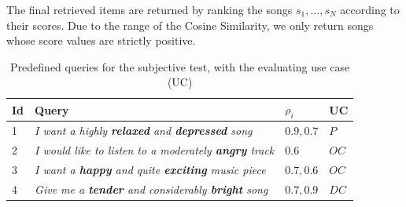 The final retrieved items are returned by ranking the songs $s_1,...,s_N$ according to their scores. Due to the range of the Cosine Similarity, we only return songs whose score values are strictly positive.
\begin{table}[tbp]

\caption{Predefined queries for the subjective test, with the evaluating use case (UC)}
\label{tab:DCSM:queries}
\centering
\bgroup
\def\arraystretch{1.5}
\begin{tabular}{||l|p{}|p{}|p{}||}
\hline
\hline
Id & Query & $\rho_i$ & UC \\
\hline
\hline
1 & \textit{I want a highly \textbf{relaxed} and \textbf{depressed} song} & $0.9, 0.7$  & $P$ \\
\hline
2 & \textit{I would like to listen to a moderately \textbf{angry} track} & $0.6 $ & $OC$ \\
\hline
3 & \textit{I want a \textbf{happy} and quite \textbf{exciting} music piece} & $0.7, 0.6$ & $OC$ \\
\hline
4 & \textit{Give me a \textbf{tender} and considerably \textbf{bright} song} & $0.7, 0.9 $ & $ DC $\\

\end{tabular}
\end{table}
